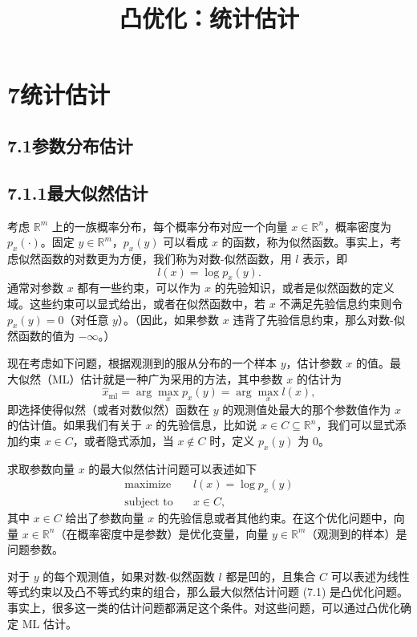 \documentclass[UTF8,12pt,a4paper,fontset=fandol]{ctexart}
\title{凸优化：统计估计}
\author{}
\date{}
\begin{document}
\maketitle

\section*{7\quad 统计估计}

\subsection*{7.1\quad 参数分布估计}

\subsection*{7.1.1\quad 最大似然估计}

考虑 $\mathbb{R}^m$ 上的一族概率分布，每个概率分布对应一个向量 $x\in\mathbb{R}^n$，概率密度为 $p_x(\cdot)$。固定 $y\in\mathbb{R}^m$，$p_x(y)$ 可以看成 $x$ 的函数，称为似然函数。事实上，考虑似然函数的对数更为方便，我们称为对数-似然函数，用 $l$ 表示，即
\[
l(x)=\log p_x(y).
\]
通常对参数 $x$ 都有一些约束，可以作为 $x$ 的先验知识，或者是似然函数的定义域。这些约束可以显式给出，或者在似然函数中，若 $x$ 不满足先验信息约束则令 $p_x(y)=0$（对任意 $y$）。（因此，如果参数 $x$ 违背了先验信息约束，那么对数-似然函数的值为 $-\infty$。）

现在考虑如下问题，根据观测到的服从分布的一个样本 $y$，估计参数 $x$ 的值。最大似然（ML）估计就是一种广为采用的方法，其中参数 $x$ 的估计为
\[
\hat{x}_{\mathrm{ml}}=\arg\max_x p_x(y)=\arg\max_x l(x),
\]
即选择使得似然（或者对数似然）函数在 $y$ 的观测值处最大的那个参数值作为 $x$ 的估计值。如果我们有关于 $x$ 的先验信息，比如说 $x\in C\subseteq\mathbb{R}^n$，我们可以显式添加约束 $x\in C$，或者隐式添加，当 $x\notin C$ 时，定义 $p_x(y)$ 为 $0$。

求取参数向量 $x$ 的最大似然估计问题可以表述如下
\begin{equation}
\begin{aligned}
\text{maximize}\quad & l(x)=\log p_x(y)\\
\text{subject to}\quad & x\in C,
\end{aligned}
\tag{7.1}
\end{equation}
其中 $x\in C$ 给出了参数向量 $x$ 的先验信息或者其他约束。在这个优化问题中，向量 $x\in\mathbb{R}^n$（在概率密度中是参数）是优化变量，向量 $y\in\mathbb{R}^m$（观测到的样本）是问题参数。

对于 $y$ 的每个观测值，如果对数-似然函数 $l$ 都是凹的，且集合 $C$ 可以表述为线性等式约束以及凸不等式约束的组合，那么最大似然估计问题 (7.1) 是凸优化问题。事实上，很多这一类的估计问题都满足这个条件。对这些问题，可以通过凸优化确定 ML 估计。
\end{document}
